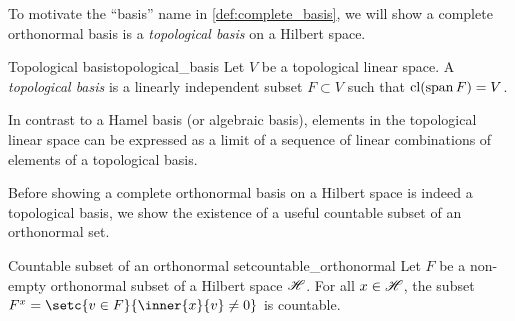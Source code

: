 To motivate the \enquote{basis} name in \cref{def:complete_basis}, we will show a complete orthonormal basis is a \emph{topological basis} on a Hilbert space.
\begin{definition}{Topological basis}{topological_basis}
    Let \(V\) be a topological linear space. A \emph{topological basis} is a linearly independent subset \(F\subset V\) such that \(\operatorname{cl}(\operatorname{span} F) = V\).
\end{definition}
In contrast to a Hamel basis (or algebraic basis), elements in the topological linear space can be expressed as a limit of a sequence of linear combinations of elements of a topological basis.

Before showing a complete orthonormal basis on a Hilbert space is indeed a topological basis, we show the existence of a useful countable subset of an orthonormal set.
\begin{lemma}{Countable subset of an orthonormal set}{countable_orthonormal}
    Let \(F\) be a non-empty orthonormal subset of a Hilbert space \(\mathscr{H}\). For all \(x \in \mathscr{H}\), the subset \(F^x = \setc{v \in F}{\inner{x}{v} \neq 0}\) is countable.
\end{lemma}
